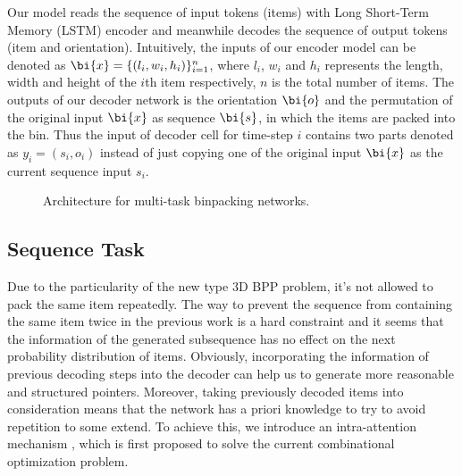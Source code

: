 Our model reads the sequence of input tokens (items) with Long Short-Term Memory (LSTM)  \cite{hochreiter1997long} encoder and meanwhile decodes the sequence of output tokens (item and orientation). Intuitively, the inputs of our encoder model can be denoted as $\bi{x} = \{(l_i, w_i, h_i)\}_{i=1}^n$, where $l_i$, $w_i$ and $h_i$ represents the length, width and height of the $i$th item respectively,
$n$ is the total number of items.
The outputs of our decoder network is the orientation $\bi{o}$ and the permutation of the original input $\bi{x}$ as sequence $\bi{s}$,
in which the items are packed into the bin.
Thus the input of decoder cell for time-step $i$ contains two parts denoted as $y_i=(s_i, o_i)$ instead of just copying one of the original input $\bi{x}$ as the current sequence input $s_i$. 

\begin{figure}[h]
	\centering
	\caption{Architecture for multi-task binpacking networks. }
	\label{fig:architecture-model}
	\vspace{-10pt}
\end{figure}


\subsection{Sequence Task}
\label{sec:sequence_task}
Due to the particularity of the new type 3D BPP problem, it's not allowed to pack the same item repeatedly. The way to prevent the sequence from containing the same item 
twice in the previous work \cite{Hu2017Solving} is a hard constraint and 
it seems that the information of the generated subsequence has no effect on 
the next probability distribution of items.
Obviously, incorporating the information of previous decoding steps into the decoder can help us to generate more reasonable and structured pointers.   
Moreover, taking previously decoded items into consideration means that the network has a priori knowledge to try to avoid repetition to some extend.
To achieve this, we introduce an intra-attention mechanism \cite{paulus2017deep}, which is first proposed to solve the current combinational optimization problem. 

